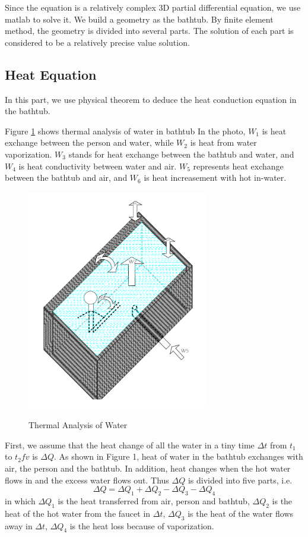 \documentclass[12pt,a4paper,titlepage]{article}
\begin{document}
Since the equation is a relatively complex 3D partial differential equation, we use matlab to solve it.
We build a geometry as the bathtub. By finite element method, the geometry is divided into several parts.
The solution of each part is considered to be a relatively precise value solution.



\subsection{Heat Equation}
\label{sec:heat equation}

In this part, we use physical theorem to deduce the heat conduction equation in the bathtub.


Figure \ref{1_p} shows thermal analysis of water in bathtub
In the photo, $W_1$ is heat exchange between the person and water, while $W_2$ is heat from water vaporization. $W_3$ stands for heat exchange between the bathtub and water, and $W_4$ is heat conductivity between water and air. $W_5$ represents heat exchange between the bathtub and air, and $W_6$ is heat increasement with hot in-water.

\begin{figure}[htb]
  \centering
  \includegraphics[width=8cm]{2.pdf}\\
  \caption{Thermal Analysis of Water}\label{1_p}
\end{figure}

First, we assume that the heat change of all the water in a tiny time $\Delta t$ from $t_1$ to $t_2fv$ is $\Delta Q$.
As shown in Figure 1, heat of water in the bathtub exchanges with air, the person and the bathtub.
In addition, heat changes when the hot water flows in and the excess water flows out.
Thus $\Delta Q$ is divided into five parts, i.e.
\begin{equation}
 \Delta Q=\Delta Q_1+\Delta Q_2-\Delta Q_3-\Delta Q_4
\end{equation}
in which $\Delta Q_1$ is the heat transferred from air, person and bathtub,
$\Delta Q_2$ is the heat of the hot water from the faucet in $\Delta t$,
$\Delta Q_3$ is the heat of the water flows away in $\Delta t$,
$\Delta Q_4$ is the heat loss because of vaporization.
\end{document}
